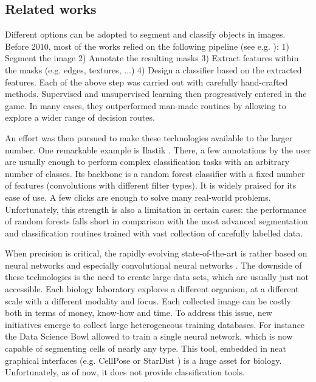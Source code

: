 \documentclass{article}
\begin{document}
\subsection{Related works}

Different options can be adopted to segment and classify objects in images. 
Before 2010, most of the works relied on the following pipeline (see e.g. \cite{irshad2013methods}): 1) Segment the image 2) Annotate the resulting masks 3) Extract features within the masks (e.g. edges, textures, ...) 4) Design a classifier based on the extracted features. 
Each of the above step was carried out with carefully hand-crafted methods. 
Supervised and unsupervised learning then progressively entered in the game. 
In many cases, they outperformed man-made routines by allowing to explore a wider range of decision routes. 

An effort was then pursued to make these technologies available to the larger number. One remarkable example is Ilastik \cite{berg2019ilastik}. There, a few annotations by the user are usually enough to perform complex classification tasks with an arbitrary number of classes. Its backbone is a random forest classifier with a fixed number of features (convolutions with different filter types). It is widely praised for its ease of use. A few clicks are enough to solve many real-world problems. Unfortunately, this strength is also a limitation in certain cases: the performance of random forests falls short in comparison with the most advanced segmentation and classification routines trained with vast collection of carefully labelled data. 

When precision is critical, the rapidly evolving state-of-the-art is rather based on neural networks and especially convolutional neural networks \cite{dhillon2020convolutional,8237584}. The downside of these technologies is the need to create large data sets, which are usually just not accessible. Each biology laboratory explores a different organism, at a different scale with a different modality and focus. Each collected image can be costly both in terms of money, know-how and time. To address this issue, new initiatives emerge to collect large heterogeneous training databases. For instance the Data Science Bowl \cite{caicedo2019nucleus} allowed to train a single neural network, which is now capable of segmenting cells of nearly any type. This tool, embedded in neat graphical interfaces (e.g. CellPose \cite{stringer2021cellpose} or StarDist \cite{fazeli2020automated}) is a huge asset for biology. Unfortunately, as of now, it does not provide classification tools.
\end{document}
